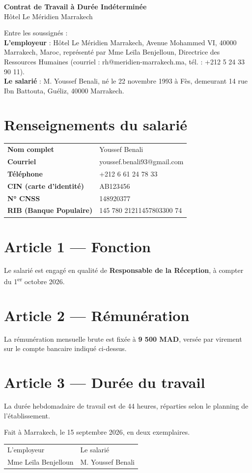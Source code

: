 \documentclass[11pt,a4paper]{article}
\begin{document}
\begin{center}
{\LARGE\bfseries\color{accent} Contrat de Travail à Durée Indéterminée}\\[0.4em]
{\large Hôtel Le Méridien Marrakech}
\end{center}
\vspace{0.5em}

Entre les soussignés :\\[0.5em]
\textbf{L'employeur} : Hôtel Le Méridien Marrakech, Avenue Mohammed VI, 40000 Marrakech, Maroc,
représenté par Mme Leïla Benjelloun, Directrice des Ressources Humaines
(courriel : rh@meridien-marrakech.ma, tél. : +212 5 24 33 90 11).\\[0.5em]
\textbf{Le salarié} : M. Youssef Benali, né le 22 novembre 1993 à Fès,
demeurant 14 rue Ibn Battouta, Guéliz, 40000 Marrakech.

\section{Renseignements du salarié}
\begin{tabularx}{\linewidth}{@{}>{\bfseries}l X@{}}
Nom complet & Youssef Benali \\
Courriel & youssef.benali93@gmail.com \\
Téléphone & +212 6 61 24 78 33 \\
CIN (carte d'identité) & AB123456 \\
N° CNSS & 148920377 \\
RIB (Banque Populaire) & 145 780 21211457803300 74 \\
\end{tabularx}

\section{Article 1 — Fonction}
Le salarié est engagé en qualité de \textbf{Responsable de la Réception}, à compter
du 1\textsuperscript{er} octobre 2026.

\section{Article 2 — Rémunération}
La rémunération mensuelle brute est fixée à \textbf{9 500 MAD}, versée par virement
sur le compte bancaire indiqué ci-dessus.

\section{Article 3 — Durée du travail}
La durée hebdomadaire de travail est de 44 heures, réparties selon le planning de l'établissement.

\vspace{1.5em}
Fait à Marrakech, le 15 septembre 2026, en deux exemplaires.\\[1.5em]
\begin{tabularx}{\linewidth}{@{}X X@{}}
L'employeur & Le salarié \\
Mme Leïla Benjelloun & M. Youssef Benali \\
\end{tabularx}
\end{document}
